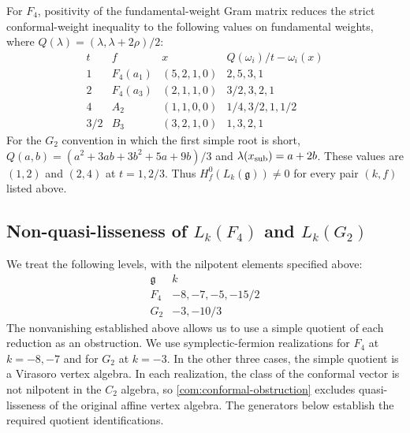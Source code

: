 \documentclass[11pt,a4paper]{amsart}
\numberwithin{equation}{section}
\theoremstyle{definition}
\theoremstyle{remark}
\newcommand{\g}{\mathfrak g}
\begin{document}
For $F_4$, positivity of the fundamental-weight Gram matrix reduces
the strict conformal-weight inequality to the following values on fundamental weights, where
$Q(\lambda)=(\lambda,\lambda+2\rho)/2$:
$$
\begin{array}{c|c|c|c}
t&f&x&Q(\omega_i)/t-\omega_i(x)\\\hline
1&F_4(a_1)&(5,2,1,0)&2,5,3,1\\
2&F_4(a_3)&(2,1,1,0)&3/2,3,2,1\\
4&A_2&(1,1,0,0)&1/4,3/2,1,1/2\\
3/2&B_3&(3,2,1,0)&1,3,2,1
\end{array}
$$
For the $G_2$ convention in which the first simple root is short,
$Q(a,b)=(a^2+3ab+3b^2+5a+9b)/3$ and
$\lambda(x_{\rm sub})=a+2b$. These values are $(1,2)$ and $(2,4)$
at $t=1,2/3$. Thus $H_f^0(L_k(\g))\ne0$ for every pair $(k,f)$
listed above.

\subsection{\texorpdfstring{Non-quasi-lisseness of $L_k(F_4)$ and $L_k(G_2)$}{Non-quasi-lisseness of Lk(F4) and Lk(G2)}}
We treat the following levels, with the nilpotent elements specified above:
$$
 \begin{array}{c|l}
 \g&k\\\hline
 F_4&-8,-7,-5,-15/2\\
 G_2&-3,-10/3
 \end{array}
$$
The nonvanishing established above allows us to use a simple quotient of each
reduction as an obstruction. We use symplectic-fermion realizations for
$F_4$ at $k=-8,-7$ and for $G_2$ at $k=-3$. In the other three cases,
the simple quotient is a Virasoro vertex algebra. In each realization,
the class of the conformal vector is not nilpotent in the $C_2$ algebra,
so \cref{com:conformal-obstruction} excludes quasi-lisseness of the original
affine vertex algebra. The generators below establish the required
quotient identifications.
\end{document}
